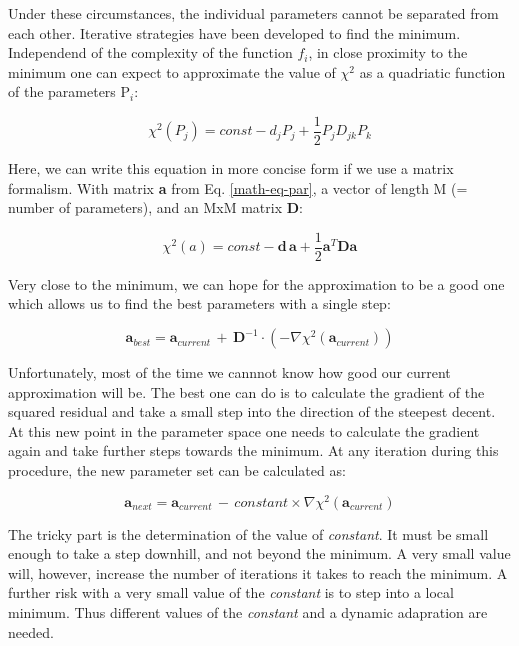 Under these circumstances, the individual parameters cannot be separated from each
other. Iterative strategies have been developed to find the minimum. Independend 
of the complexity of the function $f_{i}$, in close proximity to the minimum one
can expect to approximate the value of $\chi^2$ as a quadriatic function of the 
parameters P$_{i}$:

\begin{equation}
  \chi^2(P_{j}) = const - d_{j}P_{j}  + \frac{1}{2} P_{j}D_{jk}P_{k}
\end{equation}

Here, we can write this equation in more concise form if we use a matrix formalism.
With matrix {\bf a} from Eq. \ref{math-eq-par}, a vector of length M 
(= number of parameters), and an MxM matrix {\bf D}:

\begin{equation}
  \chi^2(a) = const - {\mathbf d}\, {\mathbf a}  + 
  \frac{1}{2} {\mathbf a}^T {\mathbf D} {\mathbf a}
  \label{math-eq-chimat}
\end{equation}

Very close to the minimum, we can hope for the approximation to be a good one 
which allows us to find the best parameters with a single step:

\begin{equation}
  {\mathbf a}_{best} = {\mathbf a}_{current} \, + \, 
  {\mathbf D}^{-1} \cdot \left (- \nabla \chi^2({\mathbf a}_{current}) \right )
  \label{math-eq-best}
\end{equation}

Unfortunately, most of the time we cannnot know how good our current approximation
will be. 
The best one can do is to calculate the gradient of the squared residual and take
a small step into the direction of the steepest decent. At this new point in the 
parameter space one needs to calculate the gradient again and take further steps
towards the minimum. At any iteration during this procedure, the new parameter set
can be calculated as:

\begin{equation}
  {\mathbf a}_{next} = {\mathbf a}_{current} \, - \,
  constant \times \nabla \chi^2({\mathbf a}_{current})
  \label{math-eq-next}
\end{equation}

The tricky part is the determination of the value of {\it constant}. It must be
small enough to take a step downhill, and not beyond the minimum. A very small
value will, however, increase the number of iterations it takes to reach the 
minimum. A further risk with a very small value of the {\it constant} is to step
into a local minimum. Thus different values of the {\it constant} and a dynamic 
adapration are needed.

